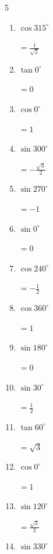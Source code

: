\begin{multicols}{5}
\begin{enumerate}
  \item $\displaystyle \cos{315^\circ}$

        $\displaystyle =\frac{1}{\sqrt{2}}$

  \item $\displaystyle \tan{0^\circ}$

        $\displaystyle =0$

  \item $\displaystyle \cos{0^\circ}$

        $\displaystyle =1$

  \item $\displaystyle \sin{300^\circ}$

        $\displaystyle =-\frac{\sqrt{3}}{2}$

  \item $\displaystyle \sin{270^\circ}$

        $\displaystyle =-1$

  \item $\displaystyle \sin{0^\circ}$

        $\displaystyle =0$

  \item $\displaystyle \cos{240^\circ}$

        $\displaystyle =-\frac{1}{2}$

  \item $\displaystyle \cos{360^\circ}$

        $\displaystyle =1$

  \item $\displaystyle \sin{180^\circ}$

        $\displaystyle =0$

\columnbreak %

  \item $\displaystyle \sin{30^\circ}$

        $\displaystyle =\frac{1}{2}$

  \item $\displaystyle \tan{60^\circ}$

        $\displaystyle =\sqrt{3}$

  \item $\displaystyle \cos{0^\circ}$

        $\displaystyle =1$

  \item $\displaystyle \sin{120^\circ}$

        $\displaystyle =\frac{\sqrt{3}}{2}$

  \item $\displaystyle \sin{330^\circ}$


\end{enumerate}
\end{multicols}

